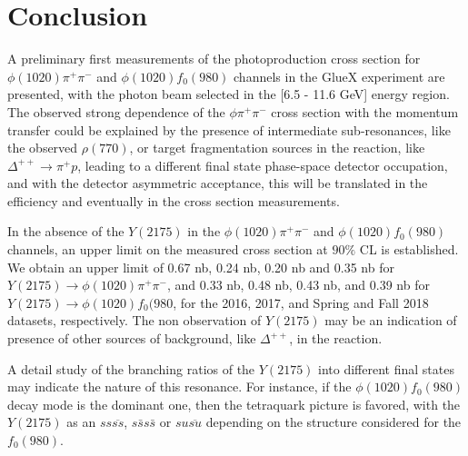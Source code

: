 \section{Conclusion}
\label{chap.y2175.conc}

A preliminary first measurements of the photoproduction cross section for $\phi(1020) \pi^+\pi^-$ and $\phi(1020) f_0(980)$ channels in the GlueX experiment are presented, with the photon beam selected in the [6.5 - 11.6 GeV] energy region. The observed strong dependence of the $\phi \pi^+\pi^-$ cross section with the momentum transfer could be explained by the presence of intermediate sub-resonances, like the observed $\rho(770)$, or target fragmentation sources in the reaction, like $\Delta^{++} \rightarrow \pi^+ p$, leading to a different final state phase-space detector occupation, and with the detector asymmetric acceptance, this will be translated in the efficiency and eventually in the cross section measurements.
~\par In the absence of the $Y(2175)$ in the $\phi(1020) \pi^+\pi^-$ and $\phi(1020) f_0(980)$ channels, an upper limit on the measured cross section at $90\%$ CL is established. We obtain an upper limit of 0.67 nb, 0.24 nb, 0.20 nb and 0.35 nb for $Y(2175)\rightarrow \phi(1020) \pi^+\pi^-$, and 0.33 nb, 0.48 nb, 0.43 nb, and 0.39 nb for $Y(2175)\rightarrow \phi(1020) f_0(980$, for the 2016, 2017, and Spring and Fall 2018 datasets, respectively. The non observation of $Y(2175)$ may be an indication of presence of other sources of background, like $\Delta^{++}$, in the reaction.
~\par A detail study of the branching ratios of the $Y(2175)$ into different final states may indicate the nature of this resonance. For instance, if the $\phi(1020) f_0(980)$ decay mode is the dominant one, then the tetraquark picture is favored, with the $Y(2175)$ as an $ss\overline{ss}$, $s\bar{s}s\bar{s}$ or $su\overline{su}$ depending on the structure considered for the $f_0(980)$.